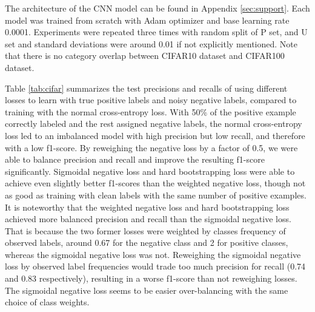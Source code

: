 The architecture of the CNN model can be found in Appendix \ref{sec:support}.
Each model was trained from scratch with Adam optimizer and base learning rate 0.0001.
Experiments were repeated three times with random split of P set, and U set and standard deviations were around 0.01 if not explicitly mentioned.
Note that there is no category overlap between CIFAR10 dataset and CIFAR100 dataset.


Table \ref{tab:cifar} summarizes the test precisions and recalls of using different losses to learn with true positive labels and noisy negative labels, compared to training with the normal cross-entropy loss.
With 50\% of the positive example correctly labeled and the rest assigned negative labels, the normal cross-entropy loss led to an imbalanced model with high precision but low recall, and therefore with a low f1-score.
By reweighing the negative loss by a factor of 0.5, we were able to balance precision and recall and improve the resulting f1-score significantly.
Sigmoidal negative loss and hard bootstrapping loss were able to achieve even slightly better f1-scores than the weighted negative loss, though not as good as training with clean labels with the same number of positive examples.
It is noteworthy that the weighted negative loss and hard bootstrapping loss achieved more balanced precision and recall than the sigmoidal negative loss.
That is because the two former losses were weighted by classes frequency of observed labels, around 0.67 for the negative class and 2 for positive classes, whereas the sigmoidal negative loss was not.
Reweighing the sigmoidal negative loss by observed label frequencies would trade too much precision for recall (0.74 and 0.83 respectively), resulting in a worse f1-score than not reweighing losses.
The sigmoidal negative loss seems to be easier over-balancing with the same choice of class weights.


